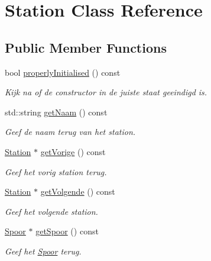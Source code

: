 \hypertarget{class_station}{}\section{Station Class Reference}
\label{class_station}
\subsection*{Public Member Functions}
\begin{DoxyCompactItemize}
\item 
\mbox{\label{class_station_a9ce626dd0599e3ea8107404a59c21e16}} 
bool \hyperlink{class_station_a9ce626dd0599e3ea8107404a59c21e16}{properly\+Initialised} () const
\begin{DoxyCompactList}\small\item\em Kijk na of de constructor in de juiste staat geeindigd is. \end{DoxyCompactList}\item 
std\+::string \hyperlink{class_station_aea6c31c39a5e1eb4c30337e7ce489e69}{get\+Naam} () const
\begin{DoxyCompactList}\small\item\em Geef de naam terug van het station. \end{DoxyCompactList}\item 
\hyperlink{class_station}{Station} $\ast$ \hyperlink{class_station_a69c0539e899ff540c38eb434a69bfa9e}{get\+Vorige} () const
\begin{DoxyCompactList}\small\item\em Geef het vorig station terug. \end{DoxyCompactList}\item 
\hyperlink{class_station}{Station} $\ast$ \hyperlink{class_station_a330c297adddcbfd5d8871075291e9512}{get\+Volgende} () const
\begin{DoxyCompactList}\small\item\em Geef het volgende station. \end{DoxyCompactList}\item 
\hyperlink{class_spoor}{Spoor} $\ast$ \hyperlink{class_station_a5230690094cdfd1e9f443d76f35c8a19}{get\+Spoor} () const
\begin{DoxyCompactList}\small\item\em Geef het \hyperlink{class_spoor}{Spoor} terug. \end{DoxyCompactList}\end{DoxyCompactItemize}



